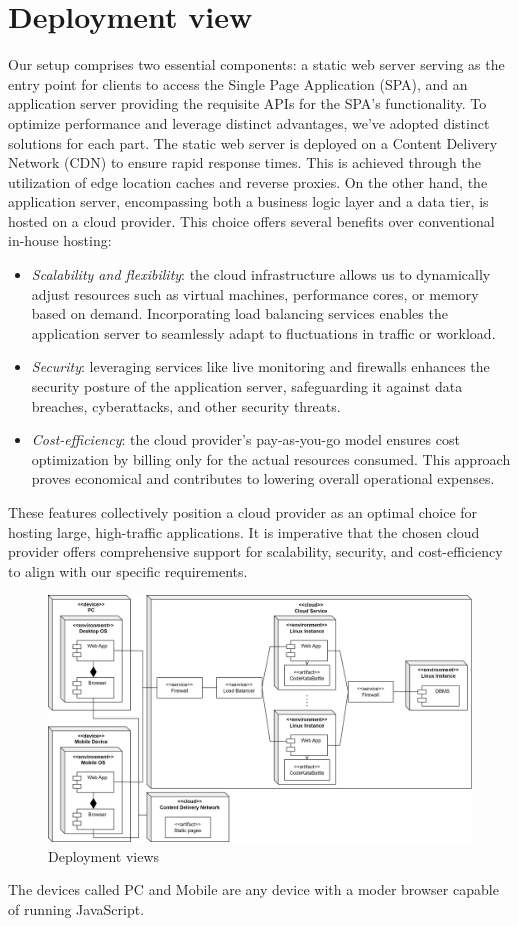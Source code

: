 \documentclass[12pt, a4paper]{report}
\begin{document}
    \section{Deployment view}
    Our setup comprises two essential components: a static web server serving as the entry point for clients to access the Single Page Application (SPA), and an application server providing the requisite APIs for the SPA's functionality. 
    To optimize performance and leverage distinct advantages, we've adopted distinct solutions for each part.
    The static web server is deployed on a Content Delivery Network (CDN) to ensure rapid response times. 
    This is achieved through the utilization of edge location caches and reverse proxies. 
    On the other hand, the application server, encompassing both a business logic layer and a data tier, is hosted on a cloud provider. 
    This choice offers several benefits over conventional in-house hosting:
    \begin{itemize}
        \item \textit{Scalability and flexibility}: the cloud infrastructure allows us to dynamically adjust resources such as virtual machines, performance cores, or memory based on demand. Incorporating load balancing services enables the application server to seamlessly adapt to fluctuations in traffic or workload.
        \item \textit{Security}: leveraging services like live monitoring and firewalls enhances the security posture of the application server, safeguarding it against data breaches, cyberattacks, and other security threats.
        \item \textit{Cost-efficiency}: the cloud provider's pay-as-you-go model ensures cost optimization by billing only for the actual resources consumed. This approach proves economical and contributes to lowering overall operational expenses.
    \end{itemize}
    These features collectively position a cloud provider as an optimal choice for hosting large, high-traffic applications. 
    It is imperative that the chosen cloud provider offers comprehensive support for scalability, security, and cost-efficiency to align with our specific requirements.
    \begin{figure}[H]
        \centering
        \includegraphics[width=0.9\linewidth]{images/deployment_view.png}
        \caption{Deployment views}
    \end{figure}
    The devices called PC and Mobile are any device with a moder browser capable of running JavaScript. 
    
\end{document}
